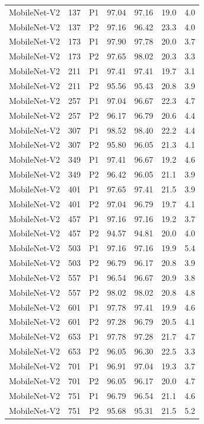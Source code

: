 {\begin{longtable}{lrlrrrr}
MobileNet-V2 & 137 & P1 & 97.04 & 97.16 & 19.0 & 4.0 \\
MobileNet-V2 & 137 & P2 & 97.16 & 96.42 & 23.3 & 4.0 \\
MobileNet-V2 & 173 & P1 & 97.90 & 97.78 & 20.0 & 3.7 \\
MobileNet-V2 & 173 & P2 & 97.65 & 98.02 & 20.3 & 3.3 \\
MobileNet-V2 & 211 & P1 & 97.41 & 97.41 & 19.7 & 3.1 \\
MobileNet-V2 & 211 & P2 & 95.56 & 95.43 & 20.8 & 3.9 \\
MobileNet-V2 & 257 & P1 & 97.04 & 96.67 & 22.3 & 4.7 \\
MobileNet-V2 & 257 & P2 & 96.17 & 96.79 & 20.6 & 4.4 \\
MobileNet-V2 & 307 & P1 & 98.52 & 98.40 & 22.2 & 4.4 \\
MobileNet-V2 & 307 & P2 & 95.80 & 96.05 & 21.3 & 4.1 \\
MobileNet-V2 & 349 & P1 & 97.41 & 96.67 & 19.2 & 4.6 \\
MobileNet-V2 & 349 & P2 & 96.42 & 96.05 & 21.1 & 3.9 \\
MobileNet-V2 & 401 & P1 & 97.65 & 97.41 & 21.5 & 3.9 \\
MobileNet-V2 & 401 & P2 & 97.04 & 96.79 & 19.7 & 4.1 \\
MobileNet-V2 & 457 & P1 & 97.16 & 97.16 & 19.2 & 3.7 \\
MobileNet-V2 & 457 & P2 & 94.57 & 94.81 & 20.0 & 4.0 \\
MobileNet-V2 & 503 & P1 & 97.16 & 97.16 & 19.9 & 5.4 \\
MobileNet-V2 & 503 & P2 & 96.79 & 96.17 & 20.8 & 3.9 \\
MobileNet-V2 & 557 & P1 & 96.54 & 96.67 & 20.9 & 3.8 \\
MobileNet-V2 & 557 & P2 & 98.02 & 98.02 & 20.8 & 4.8 \\
MobileNet-V2 & 601 & P1 & 97.78 & 97.41 & 19.9 & 4.6 \\
MobileNet-V2 & 601 & P2 & 97.28 & 96.79 & 20.5 & 4.1 \\
MobileNet-V2 & 653 & P1 & 97.78 & 97.28 & 21.7 & 4.7 \\
MobileNet-V2 & 653 & P2 & 96.05 & 96.30 & 22.5 & 3.3 \\
MobileNet-V2 & 701 & P1 & 96.91 & 97.04 & 19.3 & 3.7 \\
MobileNet-V2 & 701 & P2 & 96.05 & 96.17 & 20.0 & 4.7 \\
MobileNet-V2 & 751 & P1 & 96.79 & 96.54 & 21.1 & 4.6 \\
MobileNet-V2 & 751 & P2 & 95.68 & 95.31 & 21.5 & 5.2 \\

\end{longtable}}

